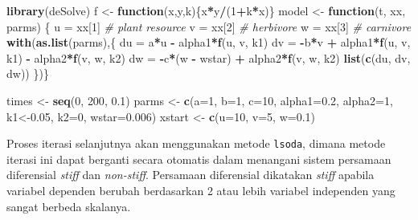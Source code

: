 \documentclass[]{book}
\newenvironment{Shaded}{\begin{snugshade}}{\end{snugshade}}
\newcommand{\CommentTok}[1]{\textcolor[rgb]{0.56,0.35,0.01}{\textit{#1}}}
\newcommand{\ControlFlowTok}[1]{\textcolor[rgb]{0.13,0.29,0.53}{\textbf{#1}}}
\newcommand{\DataTypeTok}[1]{\textcolor[rgb]{0.13,0.29,0.53}{#1}}
\newcommand{\DecValTok}[1]{\textcolor[rgb]{0.00,0.00,0.81}{#1}}
\newcommand{\FloatTok}[1]{\textcolor[rgb]{0.00,0.00,0.81}{#1}}
\newcommand{\KeywordTok}[1]{\textcolor[rgb]{0.13,0.29,0.53}{\textbf{#1}}}
\newcommand{\NormalTok}[1]{#1}
\newcommand{\OperatorTok}[1]{\textcolor[rgb]{0.81,0.36,0.00}{\textbf{#1}}}
\newcommand{\StringTok}[1]{\textcolor[rgb]{0.31,0.60,0.02}{#1}}
\theoremstyle{definition}
\theoremstyle{definition}
\theoremstyle{definition}
\theoremstyle{remark}
\begin{document}
\begin{Shaded}
\begin{Highlighting}[]
\KeywordTok{library}\NormalTok{(deSolve)}
\NormalTok{f <-}\StringTok{ }\ControlFlowTok{function}\NormalTok{(x,y,k)\{x}\OperatorTok{*}\NormalTok{y}\OperatorTok{/}\NormalTok{(}\DecValTok{1}\OperatorTok{+}\NormalTok{k}\OperatorTok{*}\NormalTok{x)\}}
\NormalTok{model <-}\StringTok{ }\ControlFlowTok{function}\NormalTok{(t, xx, parms) \{}
\NormalTok{    u =}\StringTok{ }\NormalTok{xx[}\DecValTok{1}\NormalTok{] }\CommentTok{# plant resource}
\NormalTok{    v =}\StringTok{ }\NormalTok{xx[}\DecValTok{2}\NormalTok{] }\CommentTok{# herbivore}
\NormalTok{    w =}\StringTok{ }\NormalTok{xx[}\DecValTok{3}\NormalTok{] }\CommentTok{# carnivore}
    \KeywordTok{with}\NormalTok{(}\KeywordTok{as.list}\NormalTok{(parms),\{}
\NormalTok{    du =}\StringTok{ }\NormalTok{a}\OperatorTok{*}\NormalTok{u }\OperatorTok{-}\StringTok{ }\NormalTok{alpha1}\OperatorTok{*}\KeywordTok{f}\NormalTok{(u, v, k1)}
\NormalTok{    dv =}\StringTok{ }\OperatorTok{-}\NormalTok{b}\OperatorTok{*}\NormalTok{v }\OperatorTok{+}\StringTok{ }\NormalTok{alpha1}\OperatorTok{*}\KeywordTok{f}\NormalTok{(u, v, k1) }\OperatorTok{-}\StringTok{ }\NormalTok{alpha2}\OperatorTok{*}\KeywordTok{f}\NormalTok{(v, w, k2)}
\NormalTok{    dw =}\StringTok{ }\OperatorTok{-}\NormalTok{c}\OperatorTok{*}\NormalTok{(w }\OperatorTok{-}\StringTok{ }\NormalTok{wstar) }\OperatorTok{+}\StringTok{ }\NormalTok{alpha2}\OperatorTok{*}\KeywordTok{f}\NormalTok{(v, w, k2)}
    \KeywordTok{list}\NormalTok{(}\KeywordTok{c}\NormalTok{(du, dv, dw))}
\NormalTok{\})\}}

\NormalTok{times <-}\StringTok{ }\KeywordTok{seq}\NormalTok{(}\DecValTok{0}\NormalTok{, }\DecValTok{200}\NormalTok{, }\FloatTok{0.1}\NormalTok{)}
\NormalTok{parms <-}\StringTok{ }\KeywordTok{c}\NormalTok{(}\DataTypeTok{a=}\DecValTok{1}\NormalTok{, }\DataTypeTok{b=}\DecValTok{1}\NormalTok{, }\DataTypeTok{c=}\DecValTok{10}\NormalTok{, }\DataTypeTok{alpha1=}\FloatTok{0.2}\NormalTok{, }\DataTypeTok{alpha2=}\DecValTok{1}\NormalTok{,}
\NormalTok{k1<-}\FloatTok{0.05}\NormalTok{, }\DataTypeTok{k2=}\DecValTok{0}\NormalTok{, }\DataTypeTok{wstar=}\FloatTok{0.006}\NormalTok{)}
\NormalTok{xstart <-}\StringTok{ }\KeywordTok{c}\NormalTok{(}\DataTypeTok{u=}\DecValTok{10}\NormalTok{, }\DataTypeTok{v=}\DecValTok{5}\NormalTok{, }\DataTypeTok{w=}\FloatTok{0.1}\NormalTok{)}
\end{Highlighting}
\end{Shaded}

Proses iterasi selanjutnya akan menggunakan metode \texttt{lsoda}, dimana metode iterasi ini dapat berganti secara otomatis dalam menangani sistem persamaan diferensial \emph{stiff} dan \emph{non-stiff}. Persamaan diferensial dikatakan \emph{stiff} apabila variabel dependen berubah berdasarkan 2 atau lebih variabel independen yang sangat berbeda skalanya.
\end{document}

